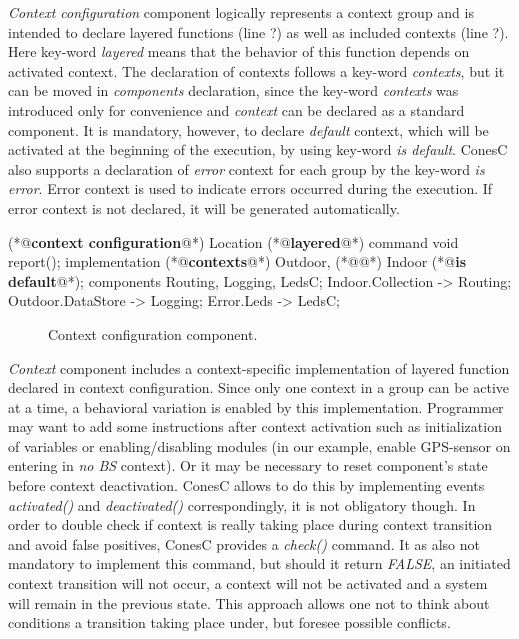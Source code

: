 \emph{Context configuration} component logically represents a context group and is intended to declare layered functions (line ?) as well as included contexts (line ?). Here key-word \emph{layered} means that the behavior of this function depends on activated context. The declaration of contexts follows a key-word \emph{contexts}, but it can be moved in \emph{components} declaration, since the key-word \emph{contexts} was introduced only for convenience and \emph{context} can be declared as a standard component. It is mandatory, however, to declare \emph{default} context, which will be activated at the beginning of the execution, by using key-word \emph{is default}. ConesC also supports a declaration of \emph{error} context for each group by the key-word \emph{is error}. Error context is used to indicate errors occurred during the execution. If error context is not declared, it will be generated automatically.

\begin{Sbox}
\begin{minipage}{\columnwidth}
\begin{csource}
(*@\textbf{context configuration}@*) Location {
(*@\textbf{layered}@*) command void report();}
implementation {
(*@\textbf{contexts}@*) Outdoor,
(*@@*) Indoor (*@\textbf{is default}@*);
 components Routing, Logging, 
 LedsC;
 Indoor.Collection -> Routing;
 Outdoor.DataStore -> Logging;
 Error.Leds -> LedsC;}
\end{csource}
\end{minipage}
\end{Sbox}
\begin{figure}
 \TheSbox
 \caption{Context configuration component.}
 \label{fig:ccc}
\end{figure}

\emph{Context} component includes a context-specific implementation of layered function declared in context configuration. Since only one context in a group can be active at a time, a behavioral variation is enabled by this implementation. Programmer may want to add some instructions after context activation such as initialization of variables or enabling/disabling modules (in our example, enable GPS-sensor on entering in \emph{no BS} context). Or it may be necessary to reset component's state before context deactivation. ConesC allows to do this by implementing events \emph{activated()} and \emph{deactivated()} correspondingly, it is not obligatory though. In order to double check if context is really taking place during context transition and avoid false positives, ConesC provides a \emph{check()} command. It as also not mandatory to implement this command, but should it return \emph{FALSE}, an initiated context transition will not occur, a context will not be activated and a system will remain in the previous state. This approach allows one not to think about conditions a transition taking place under, but foresee possible conflicts.

